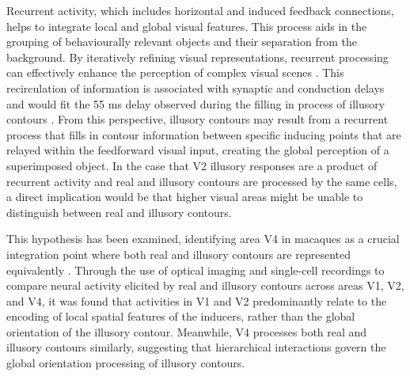 \documentclass[12pt]{article}
\begin{document}
Recurrent activity, which includes horizontal and induced feedback connections, helps to integrate local and global visual features. This process aids in the grouping of behaviourally relevant objects and their separation from the background. By iteratively refining visual representations, recurrent processing can effectively enhance the perception of complex visual scenes \autocite{roelfsemaCORTICALALGORITHMSPERCEPTUAL2006,shushruthStrongRecurrentNetworks2012}. This recirculation of information is associated with synaptic and conduction delays and would fit the 55 ms delay observed during the filling in process of illusory contours \autocite{leeDynamicsSubjectiveContour2001,pakTopDownFeedbackControls2020}. From this perspective, illusory contours may result from a recurrent process that fills in contour information between specific inducing points that are relayed within the feedforward visual input, creating the global perception of a superimposed object. In the case that V2 illusory responses are a product of recurrent activity and real and illusory contours are processed by the same cells, a direct implication would be that higher visual areas might be unable to distinguish between real and illusory contours.

\bigbreak
This hypothesis has been examined, identifying area V4 in macaques as a crucial integration point where both real and illusory contours are represented equivalently \autocite{panEquivalentRepresentationReal2012}. Through the use of optical imaging and single-cell recordings to compare neural activity elicited by real and illusory contours across areas V1, V2, and V4, it was found that activities in V1 and V2 predominantly relate to the encoding of local spatial features of the inducers, rather than the global orientation of the illusory contour. Meanwhile, V4 processes both real and illusory contours similarly, suggesting that hierarchical interactions govern the global orientation processing of illusory contours. 
\end{document}
